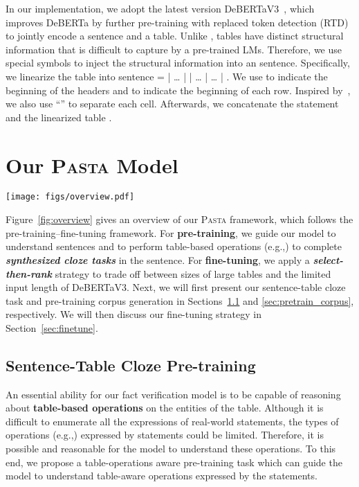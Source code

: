 \documentclass[11pt]{article}
\newcommand{\pasta}{\textsc{Pasta}\xspace}
\newcommand{\eg}{{e.g.,}\xspace}
\newcommand{\term}[1]{\xspace}
\begin{document}
In our implementation, we adopt the latest version DeBERTaV3~\cite{debertav3}, which improves DeBERTa by further pre-training with replaced token detection (RTD) to jointly encode a sentence and a table. Unlike \term{NL}, tables have distinct structural information that is difficult to capture by a pre-trained LMs. Therefore, we use special symbols to inject the structural information into an \term{NL} sentence. Specifically, we linearize the table  into sentence  = \term{[Header]}  |  … |  \term{[Row]}  |  … \term{[Row]}  |  … | . We use \term{[Header]} to indicate the beginning of the headers and \term{[Row]} to indicate the beginning of each row. Inspired by~\citealp{tapex}, we also use ``\term{|}'' to separate each cell. Afterwards, we concatenate the statement  and the linearized table .  \section{Our \pasta Model}

\begin{figure*}[t!]
\centering
	\texttt{[image: figs/overview.pdf]}
\caption{An overview of the pre-training and fine-tuning procedures of \pasta.}
	\label{fig:overview}
\end{figure*}

Figure~\ref{fig:overview} gives an overview of our \pasta framework, which follows the pre-training--fine-tuning framework. 
For {\bf pre-training}, we guide our model to understand sentences and to perform table-based operations
(\eg \term{Aggregation}) to complete \textbf{\textit{synthesized cloze tasks}} in the sentence. For {\bf fine-tuning}, we apply a \textbf{\textit{select-then-rank}} strategy to trade off between sizes of large tables and the limited input length of DeBERTaV3.
Next, we will first present our sentence-table cloze task and pre-training corpus generation in Sections~\ref{sec: pretrain_task} and \ref{sec:pretrain_corpus}, respectively. We will then discuss our fine-tuning strategy in Section~\ref{sec:finetune}.




\subsection{Sentence-Table Cloze Pre-training}
\label{sec: pretrain_task}


An essential ability for our fact verification model is to be capable of reasoning about \textbf{table-based operations} on the entities of the table.
Although it is difficult to enumerate all the expressions of real-world statements, the types of operations (\eg \term{Unique}) expressed by statements could be limited. Therefore, it is possible and reasonable for the model to understand these operations. To this end, we propose a table-operations aware pre-training task which can guide the model to understand table-aware operations expressed by the statements.
\end{document}
